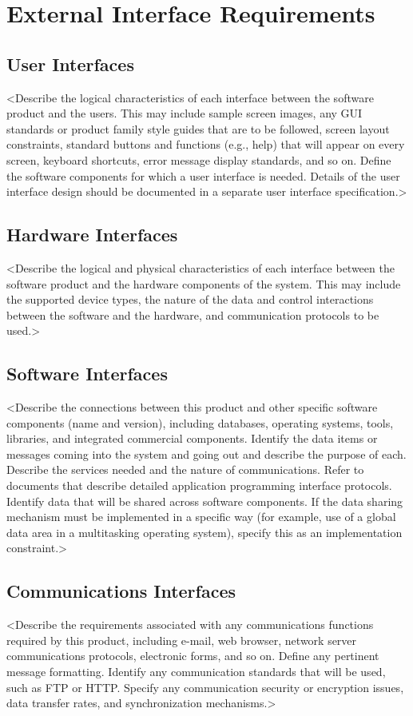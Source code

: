 \documentclass{article}
\begin{document}
\section{External Interface Requirements}
\subsection{User Interfaces}
<Describe the logical characteristics of each interface between the software product and the users. This may include sample screen images, any GUI standards or product family style guides that are to be followed, screen layout constraints, standard buttons and functions (e.g., help) that will appear on every screen, keyboard shortcuts, error message display standards, and so on. Define the software components for which a user interface is needed. Details of the user interface design should be documented in a separate user interface specification.>
\subsection{Hardware Interfaces}
<Describe the logical and physical characteristics of each interface between the software product and the hardware components of the system. This may include the supported device types, the nature of the data and control interactions between the software and the hardware, and communication protocols to be used.>
\subsection{Software Interfaces}
<Describe the connections between this product and other specific software components (name and version), including databases, operating systems, tools, libraries, and integrated commercial components. Identify the data items or messages coming into the system and going out and describe the purpose of each. Describe the services needed and the nature of communications. Refer to documents that describe detailed application programming interface protocols. Identify data that will be shared across software components. If the data sharing mechanism must be implemented in a specific way (for example, use of a global data area in a multitasking operating system), specify this as an implementation constraint.>
\subsection{Communications Interfaces}
<Describe the requirements associated with any communications functions required by this product, including e-mail, web browser, network server communications protocols, electronic forms, and so on. Define any pertinent message formatting. Identify any communication standards that will be used, such as FTP or HTTP. Specify any communication security or encryption issues, data transfer rates, and synchronization mechanisms.>
\end{document}
